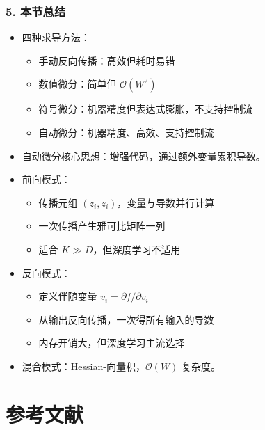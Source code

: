 \documentclass[t,aspectratio=169]{beamer} %
\begin{document}
\begin{frame}
    \frametitle{5. 本节总结}
    \begin{itemize}
        \item \alert{四种求导方法}：
        \begin{itemize}
            \item 手动反向传播：高效但耗时易错
            \item 数值微分：简单但 $\mathcal{O}(W^2)$
            \item 符号微分：机器精度但\alert{表达式膨胀}，不支持控制流
            \item \alert{自动微分}：机器精度、高效、支持控制流
        \end{itemize}
        \item \alert{自动微分核心思想}：增强代码，通过额外变量累积导数。
        \item \alert{前向模式}：
        \begin{itemize}
            \item 传播元组 $(z_i, \dot{z}_i)$，变量与导数并行计算
            \item 一次传播产生雅可比矩阵\alert{一列}
            \item 适合 $K \gg D$，但深度学习不适用
        \end{itemize}
        \item \alert{反向模式}：
        \begin{itemize}
            \item 定义伴随变量 $\overline{v}_i = \partial f / \partial v_i$
            \item 从输出反向传播，一次得\alert{所有输入}的导数
            \item 内存开销大，但深度学习\alert{主流选择}
        \end{itemize}
        \item \alert{混合模式}：Hessian-向量积，$\mathcal{O}(W)$ 复杂度。
    \end{itemize}
\end{frame}

\section{参考文献}
\end{document}
